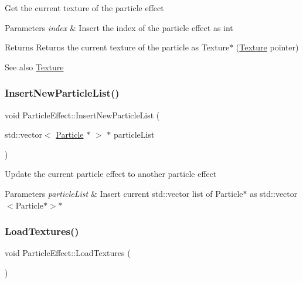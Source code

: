 Get the current texture of the particle effect 
\begin{DoxyParams}{Parameters}
{\em index} & Insert the index of the particle effect as int \\
\hline
\end{DoxyParams}
\begin{DoxyReturn}{Returns}
Returns the current texture of the particle as Texture$\ast$ (\mbox{\hyperlink{class_texture}{Texture}} pointer) 
\end{DoxyReturn}
\begin{DoxySeeAlso}{See also}
\mbox{\hyperlink{class_texture}{Texture}} 
\end{DoxySeeAlso}
\mbox{\label{class_particle_effect_a2c4eafa97d1536cda09ad3c7cb771719}} 
\subsubsection{\texorpdfstring{InsertNewParticleList()}{InsertNewParticleList()}}
{\footnotesize\ttfamily void Particle\+Effect\+::\+Insert\+New\+Particle\+List (\begin{DoxyParamCaption}\item[{std\+::vector$<$ \mbox{\hyperlink{struct_particle}{Particle}} $\ast$ $>$ $\ast$}]{particle\+List }\end{DoxyParamCaption})}

Update the current particle effect to another particle effect 
\begin{DoxyParams}{Parameters}
{\em particle\+List} & Insert current std\+::vector list of Particle$\ast$ as std\+::vector$<$\+Particle$\ast$$>$$\ast$ \\
\hline
\end{DoxyParams}
\mbox{\label{class_particle_effect_acb6c2b7f72f1ac01b8307c475f7bfdd5}} 
\subsubsection{\texorpdfstring{LoadTextures()}{LoadTextures()}}
{\footnotesize\ttfamily void Particle\+Effect\+::\+Load\+Textures (\begin{DoxyParamCaption}{ }\end{DoxyParamCaption})}

